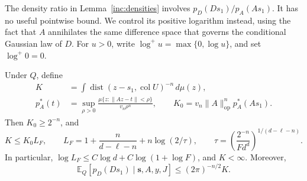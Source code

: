 The density ratio in Lemma~\ref{inc:densities} involves
\(p_D(Ds_1)/p_A(As_1)\).  It has no useful pointwise bound.  We control
its positive logarithm instead, using the fact that \(A\) annihilates
the same difference space that governs the conditional Gaussian law
of \(D\).  For \(u>0\), write \(\log^+u=\max\{0,\log u\}\), and set
\(\log^+0=0\).

\begin{lemma}\label{inc:kernel}
Under \(Q\), define
\[
 \begin{split}
 K&=\int
   \operatorname{dist}(z-s_1,\operatorname{col}U)^{-n}\,d\mu(z),\\
 p_A^*(t)&=\sup_{\rho>0}
   \frac{\mu\{z:\|Az-t\|<\rho\}}{v_n\rho^n},\qquad
 K_0=v_n\|A\|_{\mathrm{op}}^n p_A^*(As_1).
 \end{split}
\]
Then \(K_0\ge2^{-n}\), and
\begin{equation}\label{inc:kernel-bound}
 K\le K_0L_F,\qquad
 L_F=1+\frac{n}{d-\ell-n}+n\log(2/\tau),\qquad
 \tau=\left(\frac{2^{-n}}{Fd^d}\right)^{1/(d-\ell-n)}.
\end{equation}
In particular,
\(\log L_F\le C\log d+C\log(1+\log F)\), and \(K<\infty\).
Moreover,
\begin{equation}\label{inc:conditional-density}
 \mathbb E_Q[p_D(Ds_1)\mid\mathbf s,A,y,J]
 \le (2\pi)^{-n/2}K .
\end{equation}
\end{lemma}

